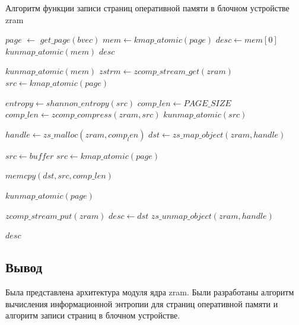 \begin{algorithm}[H]
	\small
	\caption{Алгоритм функции записи страниц оперативной памяти в блочном устройстве zram}
	\label{alg:memopt}
	\begin{algorithmic}[1]
		\State $page$ $\gets$ $get\_page(bvec)$ 
		\State $mem \gets kmap\_atomic(page)$ 
		\State $desc \gets mem[0]$
		\State $kunmap\_atomic(mem)$
		\State \Return $desc$
		\EndIf
		
		\State $kunmap\_atomic(mem)$
		\State $zstrm \gets zcomp\_stream\_get(zram)$ 
		\State $src \gets kmap\_atomic(page)$
		
		\State $entropy \gets shannon\_entropy(src)$
		 
		\State $comp\_len \gets PAGE\_SIZE$
		\Else
		\State $comp\_len \gets zcomp\_compress(zram, src)$ 
		\State $kunmap\_atomic(src)$
		\EndIf
		
		\State $handle \gets zs\_malloc(zram, comp_len)$ 
		\State $dst \gets zs\_map\_object(zram, handle)$ 

		\State $src \gets buffer$
		\State $src \gets kmap\_atomic(page)$ 
		\EndIf
		
		\State $memcpy(dst, src, comp\_len)$
		
		\State $kunmap\_atomic(page)$
		\EndIf
		
		\State $zcomp\_stream\_put(zram)$ 
		\State $desc \gets dst$
		\State $zs\_unmap\_object(zram, handle)$
		
		\State \Return $desc$
	\end{algorithmic}
\end{algorithm}

\subsection{Вывод}

Была представлена архитектура модуля ядра zram. Были разработаны алгоритм вычисления информационной энтропии для страниц оперативной памяти и алгоритм записи страниц в блочном устройстве.

\pagebreak